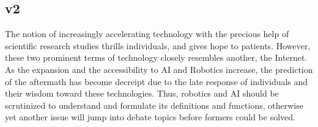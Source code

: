\documentclass[man]{apa6}
\begin{document}
\subsection{v2}
The notion of increasingly accelerating technology with the precious help of scientific research studies thrills individuals, and gives hope to patients. However, these two prominent terms of technology closely resembles another, the Internet. As the expansion and the accessibility to AI and Robotics increase, the prediction of the aftermath has become decreipt due to the late response of individuals and their wisdom toward these technologies. Thus, robotics and AI should be scrutinized to understand and formulate its definitions and functions, otherwise yet another issue will jump into debate topics before formers could be solved. 


\end{document}
